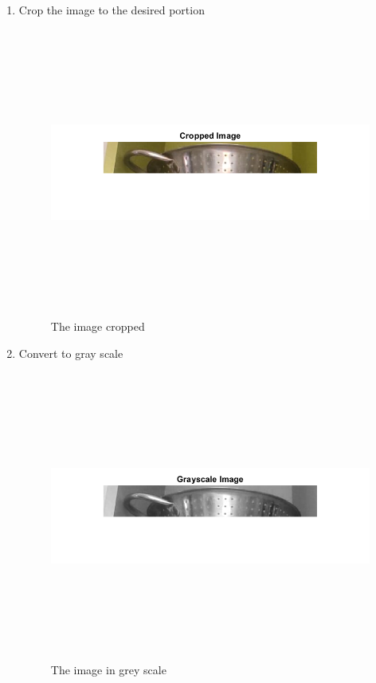 \begin{enumerate}
    \item Crop the image to the desired portion
    \begin{figure}[H]
    \centering
    \includegraphics[height=9.5cm, width=\textwidth, keepaspectratio]{Report/Images/Features/Conic/CroppedImage.png}
    \caption{\label{fig:conic:cropped image}The image cropped}
    \end{figure}

    \item Convert to gray scale
    \begin{figure}[H]
    \centering
    \includegraphics[height=9.5cm, width=\textwidth, keepaspectratio]{Report/Images/Features/Conic/GrayscaleImage.png}
    \caption{\label{fig:conic:gray scale}The image in grey scale}
    \end{figure}


\end{enumerate}
